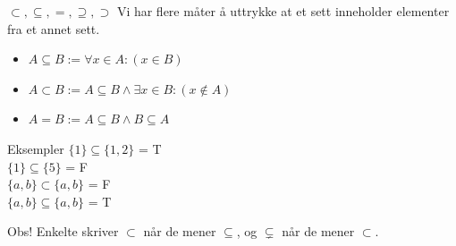 \begin{frame}{$\subset, \subseteq, =, \supseteq, \supset$}
    Vi har flere måter å uttrykke at et sett inneholder elementer fra et annet sett.
    \begin{itemize}
        \item $A \subseteq B := \forall x \in A : (x \in B)$
        \item $A \subset B := A \subseteq B \land \exists x \in B : (x \notin A)$
        \item $A = B := A \subseteq B \land B \subseteq A$
    \end{itemize}
    \pause
    \begin{block}{Eksempler}
        $\{1\} \subseteq \{1, 2\}$ = T\\
        $\{1\} \subseteq \{5\}$ = F\\
        $\{a, b\} \subset \{a, b\}$ = F\\
        $\{a, b\} \subseteq \{a, b\}$ = T
    \end{block}
    \pause
    \centering
    Obs! Enkelte skriver $\subset$ når de mener $\subseteq$, og $\subsetneq$ når de mener $\subset$.
\end{frame}

